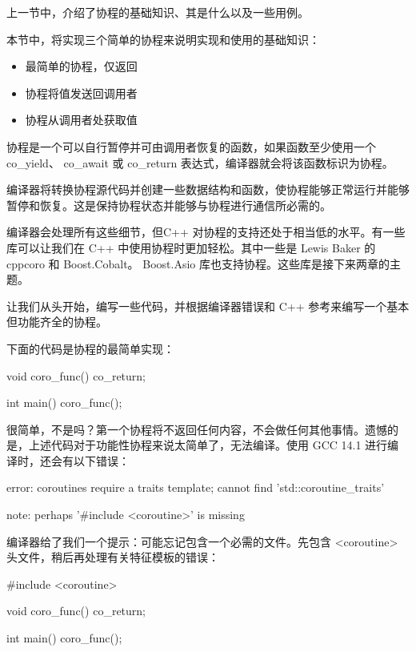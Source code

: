 
上一节中，介绍了协程的基础知识、其是什么以及一些用例。

本节中，将实现三个简单的协程来说明实现和使用的基础知识：

\begin{itemize}
\item
最简单的协程，仅返回

\item
协程将值发送回调用者

\item
协程从调用者处获取值
\end{itemize}


协程是一个可以自行暂停并可由调用者恢复的函数，如果函数至少使用一个 co\_yield、 co\_await 或 co\_return 表达式，编译器就会将该函数标识为协程。

编译器将转换协程源代码并创建一些数据结构和函数，使协程能够正常运行并能够暂停和恢复。这是保持协程状态并能够与协程进行通信所必需的。

编译器会处理所有这些细节，但C++ 对协程的支持还处于相当低的水平。有一些库可以让我们在 C++ 中使用协程时更加轻松。其中一些是 Lewis Baker 的 cppcoro 和 Boost.Cobalt。 Boost.Asio 库也支持协程。这些库是接下来两章的主题。

让我们从头开始，编写一些代码，并根据编译器错误和 C++ 参考来编写一个基本但功能齐全的协程。

下面的代码是协程的最简单实现：

\begin{cpp}
void coro_func() {
    co_return;
}

int main() {
    coro_func();
}
\end{cpp}

很简单，不是吗？第一个协程将不返回任何内容，不会做任何其他事情。遗憾的是，上述代码对于功能性协程来说太简单了，无法编译。使用 GCC 14.1 进行编译时，还会有以下错误：

\begin{shell}
error: coroutines require a traits template; cannot find 'std::coroutine_traits'

note: perhaps '#include <coroutine>' is missing
\end{shell}

编译器给了我们一个提示：可能忘记包含一个必需的文件。先包含 <coroutine> 头文件，稍后再处理有关特征模板的错误：

\begin{cpp}
#include <coroutine>

void coro_func() {
    co_return;
}

int main() {
    coro_func();
}
\end{cpp}

